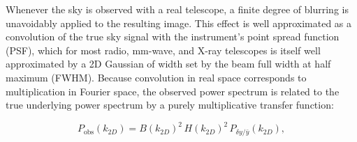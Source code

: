 Whenever the sky is observed with a real telescope, a finite degree of blurring is unavoidably applied to the resulting image. This effect is well approximated as a convolution of the true sky signal with the instrument's point spread function (PSF), which for most radio, mm-wave, and X-ray telescopes is itself well approximated by a 2D Gaussian of width set by the beam full width at half maximum (FWHM). Because convolution in real space corresponds to multiplication in Fourier space, the observed power spectrum is related to the true underlying power spectrum by a purely multiplicative transfer function:

\begin{equation}
	P_{\mathrm{obs}}(k_{2D}) = B(k_{2D})^2\, H(k_{2D})^2\, P_{\delta y/\bar{y}}(k_{2D}),
	\label{eq:beam_transfer}
\end{equation}

